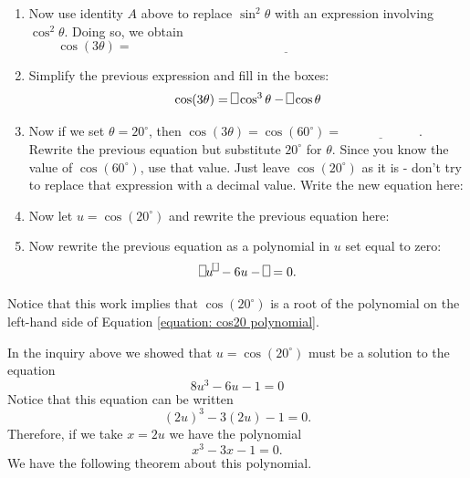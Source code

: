\documentclass[11pt]{article}
\newenvironment{task}
	{\begin{mdframed}[linecolor=lightgray, linewidth=3pt]\raggedright}
	{\end{mdframed}}
\theoremstyle{definition}
\begin{document}
\begin{task}
\begin{enumerate}
    \item Now use identity $A$ above to replace $\sin^2\theta$ with an expression involving $\cos^2\theta$. Doing so, we obtain
      \[ \cos(3\theta) =\underline{\hspace{4in}} \]
    \item Simplify the previous expression and fill in the boxes:
      \[ \cos(3\theta) = \framebox(5,8){}\cos^3\theta - \framebox(5,8){}\cos\theta\]
    \item Now if we set $\theta = 20^\circ$, then $\cos(3\theta) = \cos(60^\circ) = \underline{\hspace{1in}}$. Rewrite the previous
      equation but substitute $20^\circ$ for $\theta$. Since you know the value of $\cos(60^\circ)$, use that value. Just leave
      $\cos(20^\circ)$ as it is - don't try to replace that expression with a decimal value. Write
      the new equation here:
      \[ \]
    \item Now let $u = \cos(20^\circ)$ and rewrite the previous equation here:
      \[ \]
    \item Now rewrite the previous equation as a polynomial in $u$ set equal to zero:
      \begin{equation}
       \framebox(5,8){}u^{\framebox(4,6){}} - 6u - \framebox(5,8){} = 0. 
        \label{equation: cos20 polynomial}
      \end{equation}
  \end{enumerate}
  Notice that this work implies that $\cos(20^\circ)$ is a root of the polynomial on the left-hand side of Equation \ref{equation: cos20 polynomial}.
\end{task}

In the inquiry above we showed that $u = \cos(20^\circ)$ must be a solution to the equation
\[ 8u^3 - 6u - 1 = 0\]
Notice that this equation can be written
 \[ (2u)^3 - 3(2u) - 1 =0. \]
 Therefore, if we take $x = 2u$ we have the polynomial
 \[ x^3 - 3x - 1 =0. \]
 We have the following theorem about this polynomial.
\end{document}
